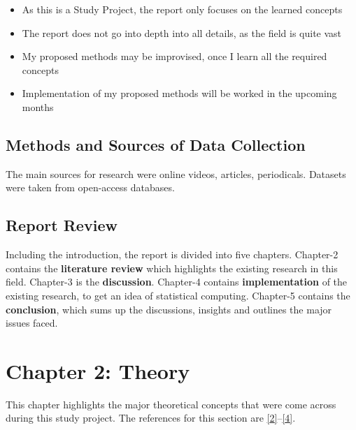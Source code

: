 \documentclass[
  english,
  doc,floatsintext]{apa6}
\providecommand{\tightlist}{%
  \setlength{\itemsep}{0pt}\setlength{\parskip}{0pt}}
\begin{document}
\begin{itemize}
\tightlist
\item
  As this is a Study Project, the report only focuses on the learned concepts
\item
  The report does not go into depth into all details, as the field is quite vast
\item
  My proposed methods may be improvised, once I learn all the required concepts
\item
  Implementation of my proposed methods will be worked in the upcoming months
\end{itemize}

\hypertarget{methods-and-sources-of-data-collection}{%
\subsection{Methods and Sources of Data Collection}\label{methods-and-sources-of-data-collection}}

The main sources for research were online videos, articles, periodicals. Datasets were taken from open-access databases.

\hypertarget{report-review}{%
\subsection{Report Review}\label{report-review}}

Including the introduction, the report is divided into five chapters. Chapter-2 contains the \textbf{literature review} which highlights the existing research in this field. Chapter-3 is the \textbf{discussion}. Chapter-4 contains \textbf{implementation} of the existing research, to get an idea of statistical computing. Chapter-5 contains the \textbf{conclusion}, which sums up the discussions, insights and outlines the major issues faced.

\newpage

\hypertarget{chapter-2-theory}{%
\section{Chapter 2: Theory}\label{chapter-2-theory}}

This chapter highlights the major theoretical concepts that were come across during this study project. The references for this section are \protect\hyperlink{ref-chazan-pantzalisSportsAnalyticsAlgorithms2020}{{[}2{]}}--\protect\hyperlink{ref-FoundationsSportsAnalytics}{{[}4{]}}.
\end{document}
